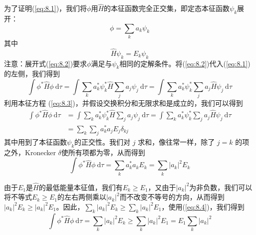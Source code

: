     为了证明(\ref{eq:8.1})，我们将$\phi$用$\hat{H}$的本征函数完全正交集，即定态本征函数$\psi_k$展开：
    \begin{equation}
        \phi = \sum_k a_k \psi_k
        \label{eq:8.2}
    \end{equation}
    其中
    \begin{equation}
        \hat{H}\psi_k = E_k \psi_k
        \label{eq:8.3}
    \end{equation}
    注意：展开式(\ref{eq:8.2})要求$\phi$满足与$\psi_k$相同的定解条件。将(\ref{eq:8.2})代入(\ref{eq:8.1})的左侧，我们得到
    \begin{equation*}
        \int \phi^{\ast}\hat{H}\phi\:\mathrm{d}\tau = \int \sum_{k}a_k^{\ast} \psi_k^{\ast} \hat{H} \sum_{j} a_j \psi_j \:\mathrm{d}\tau = \int \sum_{k}a_k^{\ast} \psi_k^{\ast} \sum_{j} a_j \hat{H} \psi_j \:\mathrm{d}\tau
    \end{equation*}
    利用本征方程 (\ref{eq:8.3})，并假设交换积分和无限求和是成立的，我们可以得到
    \begin{equation*}
        \begin{aligned}
            \int \phi^{\ast}\hat{H}\phi \:\mathrm{d}\tau &= \int \sum_{k} a_k^{\ast} \psi_k^{\ast} \hat{H} \sum_{j} a_j \psi_j \:\mathrm{d}\tau = \int \sum_{k} a_k^{\ast} \psi_k^{\ast} \sum_{j} a_j \hat{H} \psi_j \:\mathrm{d}\tau \\
            &= \sum_k\sum_{j} a_k^{\ast} a_j E_j \delta_{kj}
        \end{aligned}
    \end{equation*}
    其中用到了本征函数$\psi_k$的正交性。我们对 $j$ 求和，像往常一样，除了 $j=k$ 的项之外，Kronecker $\delta$使所有项都为零，从而得到
    \begin{equation}
        \int \phi^{\ast} \hat{H}\phi \:\mathrm{d}\tau = \sum_{k}a_k^{\ast} a_k E_k = \sum_k |a_k|^2 E_k
        \label{eq:8.4}
    \end{equation}
    
    由于$E_1$是$\hat{H}$的最低能量本征值，我们有$E_k \geq E_1$，又由于$\left|a_k\right|^2$为非负数，我们可以将不等式$E_k \geq E_1$的左右两侧乘以$|a_k|^2$而不改变不等号的方向，从而得到$|a_k|^2 E_k \geq |a_k|^2 E_1$。因此，$\sum_k |a_k|^2 E_k \geq \sum_k |a_k|^2 E_1$，使用(\ref{eq:8.4})，我们得到
    \begin{equation}
        \int \phi^{\ast} \hat{H}\phi \:\mathrm{d}\tau = \sum_k |a_k|^2 E_k \geq \sum_k |a_k|^2 E_1 = E_1 \sum_k |a_k|^2
        \label{eq:8.5}
    \end{equation}

